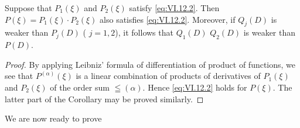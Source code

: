 \begin{corollaryu} Suppose that $P_{1}(\xi)$ and $P_{2}(\xi)$ satisfy \eqref{eq:VI.12.2}. Then $P(\xi) = P_{1}(\xi) \cdot P_{2}(\xi)$ also satisfies \eqref{eq:VI.12.2}. Moreover, if $Q_{j}(D)$ is weaker than $P_{j}(D)$ ( $j = 1, 2$), it follows that $Q_{1}(D)$ $Q_{2}(D)$ is weaker than $P(D)$. 
\end{corollaryu}

\begin{proof}
 By applying Leibniz' formula of differentiation of product of functions, we see that $P^{(\alpha)}(\xi)$ is a linear combination of products of derivatives of $P_{1}(\xi)$ and $P_{2}(\xi)$ of the order sum $\leqq (\alpha)$. Hence \eqref{eq:VI.12.2} holds for $P(\xi)$. The latter part of the Corollary may be proved similarly. 
\end{proof}

We are now ready to prove 

